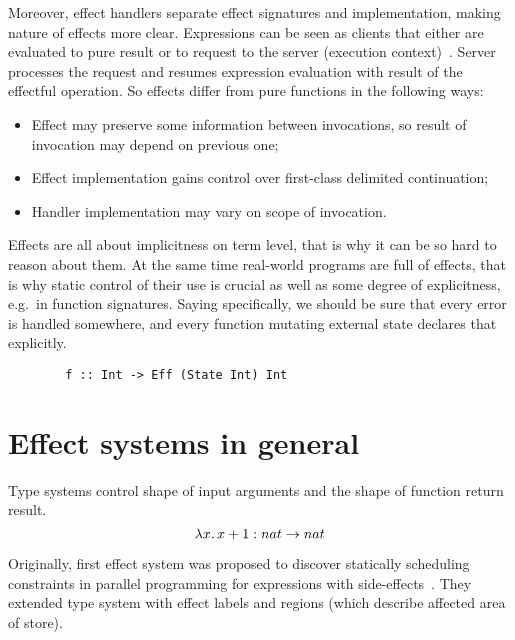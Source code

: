 \documentclass[conference]{IEEEtran}
\begin{document}
    Moreover, effect handlers separate effect signatures and implementation, making nature of effects more clear.
    Expressions can be seen as clients that either are evaluated to pure result or to request to the server (execution context)~\cite{extensible-effects}.
    Server processes the request and resumes expression evaluation with result of the effectful operation.
    So effects differ from pure functions in the following ways:
    \begin{itemize}
        \item Effect may preserve some information between invocations, so result of invocation may depend on previous one;
        \item Effect implementation gains control over first-class delimited continuation; %
        \item Handler implementation may vary on scope of invocation.
    \end{itemize}

    Effects are all about implicitness on term level, that is why it can be so hard to reason about them.
    At the same time real-world programs are full of effects, that is why static control of their use is crucial as well as some degree of explicitness, e.g.\ in function signatures.
    Saying specifically, we should be sure that every error is handled somewhere, and every function mutating external state declares that explicitly.

    \begin{verbatim}
        f :: Int -> Eff (State Int) Int
    \end{verbatim}





    \section{Effect systems in general}

    Type systems control shape of input arguments and the shape of function return result.
    \[\lambda x\ldotp x + 1 : nat\to nat\]

    Originally, first effect system was proposed to discover statically scheduling constraints in parallel programming for expressions with side-effects~\cite{first-effect-system}.
    They extended type system with effect labels and regions (which describe affected area of store).
\end{document}
